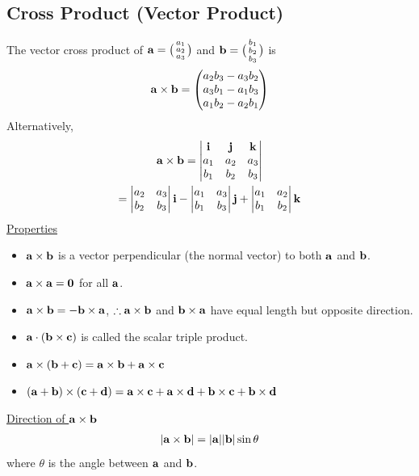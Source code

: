 \documentclass[10pt, a4paper, titlepage]{article}
\begin{document}
\begin{multicols*}{3}
	\subsection{Cross Product (Vector Product)}
	The vector cross product of $\vb{a}=\big(\begin{smallmatrix}a_1 \\a_2 \\a_3 \end{smallmatrix}\big)$
	and $\vb{b}=\big(\begin{smallmatrix}b_1 \\b_2 \\b_3 \end{smallmatrix}\big)$ is
	\begin{align}
		\vb{a}\times\vb{b}=\begin{pmatrix}a_2b_3-a_3b_2\\ a_3b_1-a_1b_3 \\a_1b_2-a_2b_1\end{pmatrix}
	\end{align}
	Alternatively,
	\begin{gather}
		\vb{a}\times\vb{b}=\begin{vmatrix}\vb{i} & \vb{j} & \vb{k} \\ a_1 & a_2 & a_3 \\ b_1 & b_2 & b_3\end{vmatrix}\\
		=\begin{vmatrix}a_2 & a_3 \\ b_2 & b_3\end{vmatrix}\vb{i}-\begin{vmatrix}a_1 & a_3 \\ b_1 & b_3\end{vmatrix}\vb{j}+\begin{vmatrix}a_1 & a_2 \\ b_1 & b_2\end{vmatrix}\vb{k}
	\end{gather}
	\underline{Properties}
	\begin{itemize}
		\item $\vb{a}\times\vb{b}$ is a vector perpendicular (the normal vector) to both $\vb{a}$ and $\vb{b}$.
		\item $\vb{a}\times\vb{a}=\vb{0}$ for all $\vb{a}$.
		\item $\vb{a}\times\vb{b}=-\vb{b}\times\vb{a}$, $\therefore\vb{a}\times\vb{b}$ and $\vb{b}\times\vb{a}$ have equal length but opposite direction.
		\item $\vb{a}\cdot(\vb{b}\times\vb{c})$ is called the scalar triple product.
		\item $\vb{a}\times(\vb{b}+\vb{c})=\vb{a}\times\vb{b}+\vb{a}\times\vb{c}$
		\item $(\vb{a}+\vb{b})\times(\vb{c}+\vb{d})\\=\vb{a}\times\vb{c}+\vb{a}\times\vb{d}+\vb{b}\times\vb{c}+\vb{b}\times\vb{d}$
	\end{itemize}
	\underline{Direction of $\vb{a}\times\vb{b}$}
	\begin{align}
		|\vb{a}\times\vb{b}|=|\vb{a}||\vb{b}|\sin{\theta}
	\end{align}
	where $\theta$ is the angle between $\vb{a}$ and $\vb{b}$.


\end{multicols*}
\end{document}
